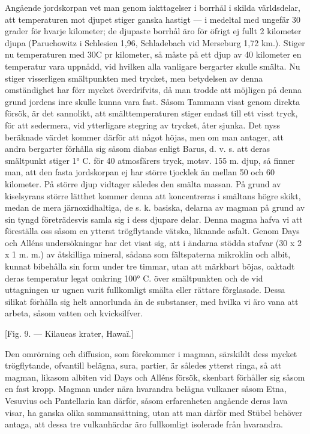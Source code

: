 \documentclass[a4paper, 12pt, oneside, swedish]{article}
\begin{document}
Angående jordskorpan vet man genom iakttagelser i borrhål i skilda världsdelar, att temperaturen mot djupet stiger ganska hastigt --- i medeltal med ungefär 30 grader för hvarje kilometer; de djupaste borrhål äro för öfrigt ej fullt 2 kilometer djupa (Paruchowitz i Schlesien 1,96, Schladebach vid Merseburg 1,72 km.). Stiger nu temperaturen med 30C pr kilometer, så måste på ett djup av 40 kilometer en temperatur vara uppnådd, vid hvilken alla vanligare bergarter skulle smälta. Nu stiger visserligen smältpunkten med trycket, men betydelsen av denna omständighet har förr mycket överdrifvits, då man trodde att möjligen på denna grund jordens inre skulle kunna vara fast. Såsom Tammann visat genom direkta försök, är det sannolikt, att smälttemperaturen stiger endast till ett visst tryck, för att sedermera, vid ytterligare stegring av trycket, åter sjunka. Det nyss beräknade värdet kommer därför att något höjas, men om man antager, att andra bergarter förhålla sig såsom diabas enligt Barus, d. v. s. att deras smältpunkt stiger 1° C. för 40 atmosfärers tryck, motsv. 155 m. djup, så finner man, att den fasta jordskorpan ej har större tjocklek än mellan 50 och 60 kilometer. På större djup vidtager således den smälta massan. På grund av kiselsyrans större lätthet kommer denna att koncentreras i smältans högre skikt, medan de mera järnoxidhaltiga, de s. k. basiska, delarna av magman på grund av sin tyngd företrädesvis samla sig i dess djupare delar. Denna magma hafva vi att föreställa oss såsom en ytterst trögflytande vätska, liknande asfalt. Genom Days och Alléns undersökningar har det visat sig, att i ändarna stödda stafvar (30 x 2 x 1 m. m.) av åtskilliga mineral, sådana som fältspaterna mikroklin och albit, kunnat bibehålla sin form under tre timmar, utan att märkbart böjas, oaktadt deras temperatur legat omkring 100° C. över smältpunkten och de vid uttagningen ur ugnen varit fullkomligt smälta eller rättare förglasade. Dessa silikat förhålla sig helt annorlunda än de substanser, med hvilka vi äro vana att arbeta, såsom vatten och kvicksilfver.

[Fig. 9. --- Kilaueas krater, Hawaï.]

Den omrörning och diffusion, som förekommer i magman, särskildt dess mycket trögflytande, ofvantill belägna, sura, partier, är således ytterst ringa, så att magman, likasom albiten vid Days och Alléns försök, skenbart förhåller sig såsom en fast kropp. Magman under nära hvarandra belägna vulkaner såsom Etna, Vesuvius och Pantellaria kan därför, såsom erfarenheten angående deras lava visar, ha ganska olika sammansättning, utan att man därför med Stübel behöver antaga, att dessa tre vulkanhärdar äro fullkomligt isolerade från hvarandra.
\end{document}
